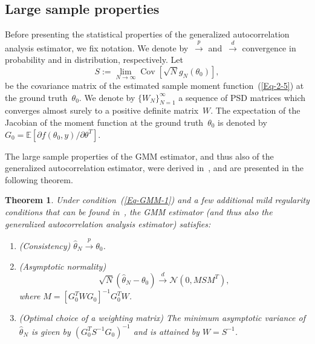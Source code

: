 \documentclass{article}
\newtheorem{theorem}[assumption]{Theorem}%
\newcommand{\E}[0]{\mathbb{E}}
\newcommand{\Cov}[0]{\operatorname{Cov}}
\begin{document}
\subsection{Large sample properties}
\label{gmm:large}
Before presenting the statistical properties of the generalized autocorrelation analysis estimator, we fix notation. We denote by~$\overset{p}{\to}$ and~$\overset{d}{\to}$ convergence in  probability and in distribution, respectively. Let
\begin{equation} \label{eqn:cov_mat_S}
	S := \lim_{N\to \infty}\Cov\left[\sqrt{N}g_N(\theta_0)\right],
\end{equation}
be the covariance matrix of the estimated sample moment function~(\ref{Eq-2-5}) at the ground truth~$\theta_0$. We denote by $\{W_N\}_{N=1}^\infty$ a sequence of PSD matrices which converges almost surely to a positive definite matrix~$W$. The expectation of the Jacobian of the moment function at the ground truth~$\theta_0$ is denoted by $G_0 = \E\left[\partial f(\theta_0, y) / \partial \theta^T\right]$.

The large sample properties of the GMM estimator, and thus also of the generalized autocorrelation estimator,  were derived in~\cite{Hansen1982}, and are presented in the following theorem.

\begin{theorem}\label{Thm-2-6}
	{Under condition~(\ref{Eq-GMM-1}) and a few additional mild regularity conditions that can be found in~\cite{Hansen1982,abas2021generalized,Hall2005}}, the GMM estimator (and thus also the generalized autocorrelation analysis estimator) satisfies:
	\begin{enumerate}[label={\Alph*}.]
		\item  \label{Thm-2-2}
		\textnormal{(Consistency)} $\hat{\theta}_N \overset{p}{\to} \theta_0$.

		\item \label{Thm-2-3} \textnormal{(Asymptotic normality)}
		\[\sqrt{N} ( \hat{\theta}_N - \theta_0) \overset{d}{\to} \mathcal{N}(0, M S M^T ),\] where $M =[G_0^T W  G_0]^{-1} G_0^T  W$.

		\item \label{Thm-2-5} \textnormal{(Optimal choice of a weighting matrix)} The minimum asymptotic variance of $\hat{\theta}_N$ is given by $(G_0^T S^{-1} G_0)^{-1}$ and is attained by $W = S^{-1}$.
	\end{enumerate}
\end{theorem}
\end{document}
